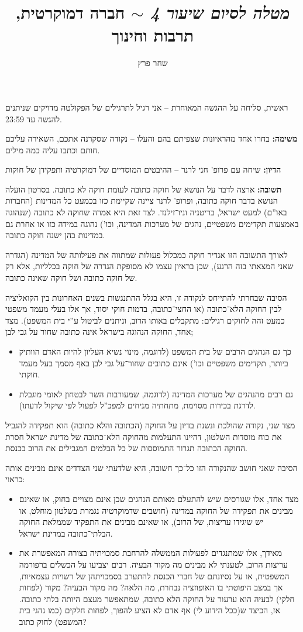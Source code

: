 \documentclass[]{../../../../tex/classes/styledArticle}
\author{שחר פרץ}
\title{\textit{מטלה לסיום שיעור 4} $\sim$ חברה דמוקרטית, תרבות וחינוך}
\begin{document}
	\maketitle
	
	ראשית, סליחה על ההגשה המאוחרת – אני רגיל לתרגילים של הפקולטה מדויקים שניתנים להגשה עד 23:59. 
	
	
	\textbf{משימה: }בחרו אחד מהראיונות שצפיתם בהם והעלו – נקודה שסקרנה אתכם, השאירה עליכם חותם וכתבו עליה כמה מילים. 
	
	\textbf{הדיון: }שיחה עם פרופ' חני לרנר – ההיבטים המוסדיים של דמוקרטיה ותפקידן של חוקות
	
	\textbf{תשובה: }ארצה לדבר על הנושא של חוקה כתובה לעומת חוקה לא כתובה. בסרטון הועלה הנושא בדבר חוקה כתובה, ופרופ' לרנר ציינה שקיימת כזו בכמעט כל המדינות (החברות באו''ם) למעט ישראל, בריטניה וניו־זילנד. לצד זאת היא אמרה שחוקה לא כתובה (שנהוגה באמצעות תקדימים משפטיים, נהגים של מערכות המדינה, וכו') נהוגה במידה כזו או אחרת גם במדינות בהן ישנה חוקה כתובה. 
	
	לאורך התשובה הזו אגדיר חוקה כמכלול פעולות שמתווה את פעילותה של המדינה (הגדרה שאני המצאתי בזה הרגע), שכן בראיון עצמו לא מסופקת הגדרה של חוקה בכלליות, אלא רק של חוקה כתובה ושל חוקה שאינה כתובה. 
	
	הסיבה שבחרתי להתייחס לנקודה זו, היא בגלל ההתנגשות בשנים האחרונות בין הקואליציה לבין החוקה הלא־כתובה (או החצי־כתובה, בדמות חוקי יסוד, אך אלו בעלי מעמד משפטי כמעט זהה לחוקים רגילים: מתקבלים באותו הרוב, וניתנים לביטול ע''י בית המשפט). מצד אחד, החוקה הנהוגה בישראל אינה כתובה שחור על גבי לבן;
	\begin{itemize}
		\item כך גם הנהגים הרבים של בית המשפט (לדוגמה, מינוי נשיא העליון להיות האדם הוותיק ביותר, תקדימים משפטיים וכו') אינם כתובים שחור־על גבי לבן באף מסמך בעל מעמד חוקתי. 
		\item גם רבים מהנהגים של מערכות המדינה (לדוגמה, שמעורבות השר לבטחון לאומי מוגבלת לדרגת בכירות מסוימת, מתחתיה מניחים למפכ''ל לפעול לפי שיקול לדעתו). 
	\end{itemize}
	מצד שני, נקודה שהולכת ונשנת בדיון על החוקה (הכתובה והלא כתובה) הוא תפקידה להגביל את כוח מוסדות השלטון, דהיינו התעלמות מהחוקה הלא־כתובה של מדינת ישראל חסרת החוקה הכתובה תגרור התמוססות של כל הבלמים המגבילים את הרוב בכנסת. 
	
	הסיבה שאני חושב שהנקודה הזו כל־כך חשובה, היא שלדעתי שני הצדדים אינם מבינים אותה כראוי: 
	\begin{itemize}
		\item מצד אחד, אלו שגורסים שיש להתעלם מאותם הנהגים שכן אינם מצויים בחוק, או שאינם מבינים את תפקידה של החוקה במדינה (חושבים שדמוקרטיה נגמרת בשלטון מוחלט, או יש שיגידו עריצות, של הרוב), או שאינם מבינים את התפקיד שממלאת החוקה הבלתי־כתובה במדינת ישראל. 
		\item מאידך, אלו שמתנגדים לפעולות הממשלה להרחבת סמכויתיה בצורה המאפשרת את עריצות הרוב, לטענתי לא מבינים מה מקור הבעיה. רבים יצביעו על הכשלים ברפורמה המשפטית, או על נסיונתם של חברי הכנסת להתערב בסמכויתהן של רשויות עצמאיות, אך במצב היפוטתי בו האופוזציה נבחרת, מה הלאה? מה מקור הבעיה? מקור (לפחות חלקי) לבעיה הוא ערעור על החוקה הלא כתובה, שמתאפשר מעצם היותה בלתי כתובה. אז, הכיצד ש(ככל הידוע לי) אף אדם לא הציע להפוך, לפחות חלקים (כמו נהגי בית המשפט) לחוק כתוב? 
	\end{itemize}
	
\end{document}
